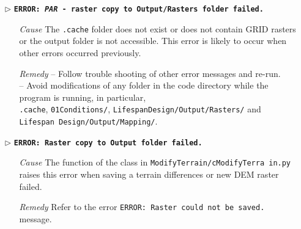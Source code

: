 \begin{itemize}
	\item[$\triangleright$]\textbf{\texttt{ERROR: \textit{PAR} - raster copy to Output/Rasters folder failed.}}
	\begin{itemize}
		\item[\textit{Cause}\hspace{0.27cm}] The \texttt{.cache} folder does not exist or does not contain GRID rasters or the output folder is not accessible. This error is likely to occur when other errors occurred previously. 
		\item[\textit{Remedy}] -- Follow trouble shooting of other error messages and re-run.\\
							   -- Avoid modifications of any folder in the code directory while the program is running, in particular,\\ \texttt{.cache}, \texttt{01{\myUnderscore}Conditions/}, \texttt{LifespanDesign/Output/Rasters/} and \texttt{Lifespan Design/Output/Mapping/}.\\
	\end{itemize}
	
	\item[$\triangleright$]\textbf{\texttt{ERROR: Raster copy to Output folder failed.}}
	\begin{itemize}
		\item[\textit{Cause}\hspace{0.27cm}] The  function of the  class in \texttt{ModifyTerrain/cModifyTerra in.py} raises this error when saving a terrain differences or new DEM raster failed.
		\item[\textit{Remedy}] Refer to the error \texttt{ERROR: Raster could not be saved.} message.\\
	\end{itemize}
	

\end{itemize}
